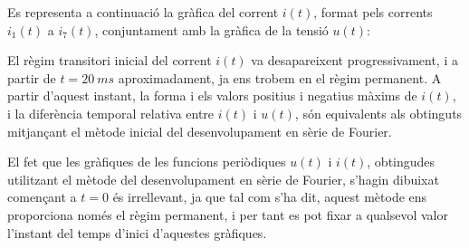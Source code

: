 \begin{exemple}
    Es representa a continuació la gràfica del corrent $i(t)$, format pels corrents $i_1(t)$ a $i_7(t)$, conjuntament amb la gràfica de la tensió $u(t)$:
    \begin{center}
      
    \end{center}

    El règim transitori inicial del corrent $i(t)$ va desapareixent progressivament, i a partir de $t=\qty{20}{ms}$ aproximadament, ja ens trobem en el règim permanent.
    A partir d'aquest instant, la forma i els valors positius i negatius màxims de $i(t)$, i la diferència temporal relativa entre $i(t)$ i $u(t)$, són equivalents als obtinguts mitjançant el mètode inicial del desenvolupament en sèrie de Fourier.

    El fet que les gràfiques de les funcions periòdiques $u(t)$ i  $i(t)$, obtingudes utilitzant el mètode del desenvolupament en sèrie de Fourier, s'hagin dibuixat començant a $t=0$ és irrellevant, ja que tal com s'ha dit,   aquest mètode ens proporciona només el règim permanent, i per tant es pot fixar a qualsevol valor l'instant del temps d'inici d'aquestes gràfiques.
\end{exemple}
